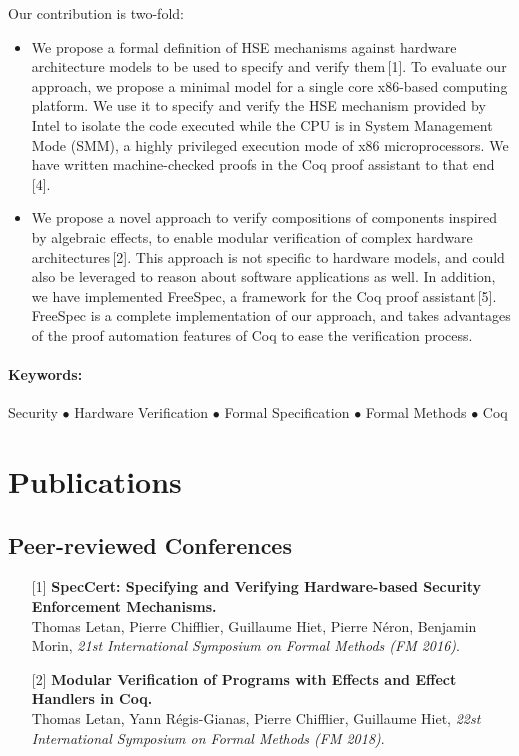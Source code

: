 \documentclass{article}
\begin{document}
Our contribution is two-fold:
%
\begin{itemize}
\item We propose a formal definition of HSE mechanisms against hardware
  architecture models to be used to specify and verify them\,[1].
  To evaluate our approach, we propose a minimal model for a single core
  x86-based computing platform.
  We use it to specify and verify the HSE mechanism provided by Intel to isolate
  the code executed while the CPU is in System Management Mode (SMM), a highly
  privileged execution mode of x86 microprocessors.
  We have written machine-checked proofs in the Coq proof assistant to that
  end\,[4].
\item We propose a novel approach to verify compositions of components inspired
  by algebraic effects, to enable modular verification of complex hardware
  architectures\,[2].
  This approach is not specific to hardware models, and could also be leveraged
  to reason about software applications as well.
  In addition, we have implemented FreeSpec, a framework for the Coq proof
  assistant\,[5].
  FreeSpec is a complete implementation of our approach, and takes advantages of
  the proof automation features of Coq to ease the verification process.
\end{itemize}

\paragraph{Keywords:}
%
Security $\bullet$ Hardware Verification $\bullet$ Formal Specification
$\bullet$ Formal Methods $\bullet$ Coq

\section{Publications}

\subsection{Peer-reviewed Conferences}

\begin{itemize}
\item[] [1] \textbf{SpecCert: Specifying and Verifying Hardware-based Security
    Enforcement
    Mechanisms.} \\
  Thomas Letan, Pierre Chifflier, Guillaume Hiet, Pierre Néron, Benjamin Morin,
  \emph{21st International Symposium on Formal Methods (FM 2016)}.
\item[] [2] \textbf{Modular Verification of Programs with Effects and Effect
    Handlers in Coq.} \\
  Thomas Letan, Yann Régis-Gianas, Pierre Chifflier, Guillaume Hiet, \emph{22st
    International Symposium on Formal Methods (FM 2018)}.
\end{itemize}
\end{document}
